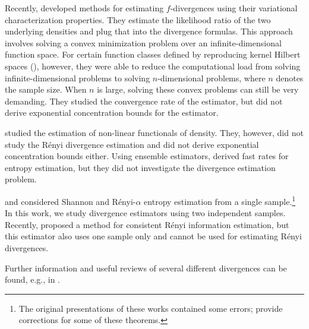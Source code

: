 Recently, \citet{nguyen10estimating}
developed methods for estimating $f$-divergences using their
variational characterization properties. They estimate the likelihood
ratio of the two underlying densities and plug that into the
divergence formulas. This approach involves solving a convex
minimization problem over an infinite-dimensional function space. For
certain function classes defined by reproducing kernel Hilbert spaces
(), however, they were able to reduce the computational
load from solving infinite-dimensional problems to solving
$n$-dimensional problems, where $n$ denotes the sample size. When $n$
is large, solving these convex problems can still be very demanding.
They studied the convergence rate of the estimator, but did not derive
exponential concentration bounds for the estimator.

\citet{2010arXiv1012.4188S,Laurent96Efficient,birge95estimation} studied the
estimation of non-linear functionals of density. They, however, did not study
the R\'enyi divergence estimation and did not derive exponential concentration
bounds either. Using ensemble estimators, \citet{sricharan12ensemble} derived
fast rates for entropy estimation, but they did not investigate the divergence
estimation problem.

\citet{Leonenko-Pronzato-Savani2008} and \citet{goria05new}
considered Shannon and R\'enyi-$\alpha$ entropy estimation from a
single sample.\footnote{The original presentations of these works
contained some errors; \citet{leonenko10correction} provide
corrections for some of these theorems.} In this work, we study
divergence estimators using two independent samples.   Recently,
\citet{pal10estimation} 
proposed a method for consistent R\'enyi information estimation, but
this estimator also uses one sample only and cannot be used for estimating
R\'enyi divergences.

Further information and useful reviews of several
different divergences can be found, e.g.,
in \citet{villmann10mathematical}. %
